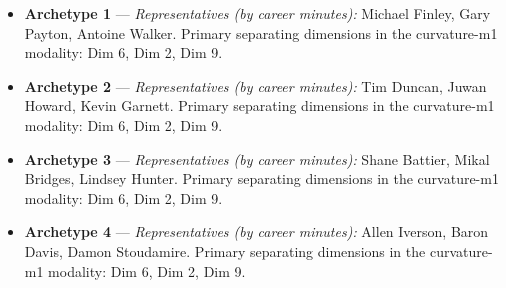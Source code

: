 \begin{itemize}
\item \textbf{Archetype 1} --- \emph{Representatives (by career minutes):} Michael Finley, Gary Payton, Antoine Walker. Primary separating dimensions in the curvature-m1 modality: Dim 6, Dim 2, Dim 9.
\item \textbf{Archetype 2} --- \emph{Representatives (by career minutes):} Tim Duncan, Juwan Howard, Kevin Garnett. Primary separating dimensions in the curvature-m1 modality: Dim 6, Dim 2, Dim 9.
\item \textbf{Archetype 3} --- \emph{Representatives (by career minutes):} Shane Battier, Mikal Bridges, Lindsey Hunter. Primary separating dimensions in the curvature-m1 modality: Dim 6, Dim 2, Dim 9.
\item \textbf{Archetype 4} --- \emph{Representatives (by career minutes):} Allen Iverson, Baron Davis, Damon Stoudamire. Primary separating dimensions in the curvature-m1 modality: Dim 6, Dim 2, Dim 9.
\end{itemize}
